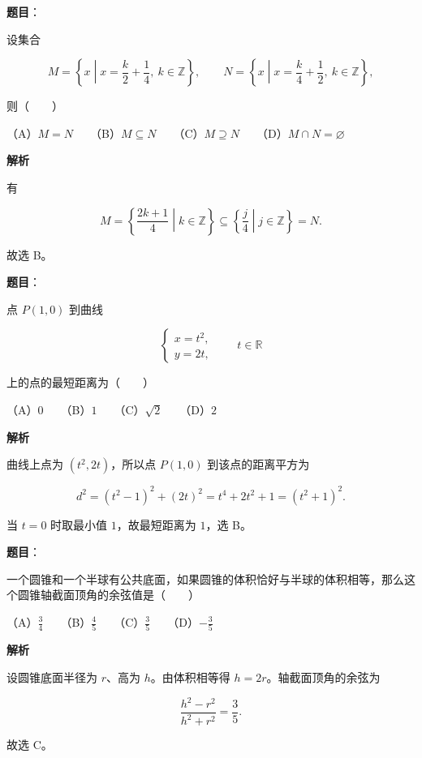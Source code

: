\begin{answer}

\textbf{题目}：

设集合

\nopagebreak[4]
\[
M=\left\{x\middle|x=\frac{k}{2}+\frac14,\ k\in\mathbb Z\right\},\qquad
N=\left\{x\middle|x=\frac{k}{4}+\frac12,\ k\in\mathbb Z\right\},
\]

则\mbox{（　　）}

（A）$M=N$　　（B）$M\subseteq N$　　（C）$M\supseteq N$　　（D）$M\cap N=\varnothing$

\textbf{解析}

有

\nopagebreak[4]
\[
M=\left\{\frac{2k+1}{4}\middle|k\in\mathbb Z\right\}
\subseteq
\left\{\frac{j}{4}\middle|j\in\mathbb Z\right\}=N.
\]

故选 B。


\end{answer}
\begin{answer}

\textbf{题目}：

点 $P(1,0)$ 到曲线

\nopagebreak[4]
\[
\begin{cases}
x=t^2,\\
y=2t,
\end{cases}
\qquad t\in\mathbb R
\]

上的点的最短距离为\mbox{（　　）}

（A）$0$　　（B）$1$　　（C）$\sqrt2$　　（D）$2$

\textbf{解析}

曲线上点为 $(t^2,2t)$，所以点 $P(1,0)$ 到该点的距离平方为

\nopagebreak[4]
\[
d^2=(t^2-1)^2+(2t)^2
=t^4+2t^2+1
=(t^2+1)^2.
\]

当 $t=0$ 时取最小值 $1$，故最短距离为 $1$，选 B。


\end{answer}
\begin{answer}

\textbf{题目}：

一个圆锥和一个半球有公共底面，如果圆锥的体积恰好与半球的体积相等，那么这个圆锥轴截面顶角的余弦值是\mbox{（　　）}

（A）$\frac34$　　（B）$\frac45$　　（C）$\frac35$　　（D）$-\frac35$

\textbf{解析}

设圆锥底面半径为 $r$、高为 $h$。由体积相等得 $h=2r$。轴截面顶角的余弦为

\nopagebreak[4]
\[
\frac{h^2-r^2}{h^2+r^2}
=\frac35.
\]

故选 C。


\end{answer}
